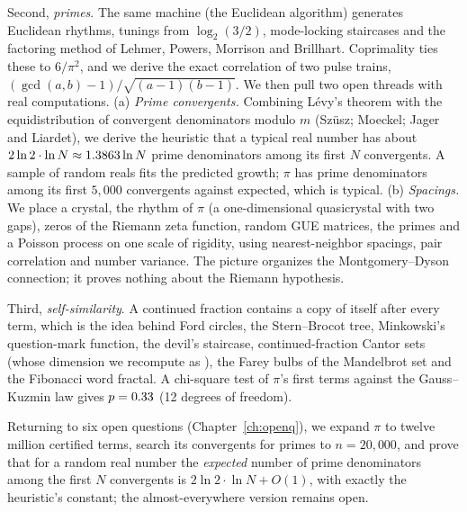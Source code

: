 Second, \emph{primes}. The same machine (the Euclidean algorithm) generates Euclidean rhythms, tunings from $\log_2(3/2)$, mode-locking staircases and the factoring method of Lehmer, Powers, Morrison and Brillhart. Coprimality ties these to $6/\pi^2$, and we derive the exact correlation of two pulse trains, $(\gcd(a,b)-1)/\sqrt{(a-1)(b-1)}$. We then pull two open threads with real computations. (a) \emph{Prime convergents.} Combining Lévy's theorem with the equidistribution of convergent denominators modulo $m$ (Szüsz; Moeckel; Jager and Liardet), we derive the heuristic that a typical real number has about $2\ln 2 \cdot \ln N \approx 1.3863\ln N$ prime denominators among its first $N$ convergents. A sample of \RandM{} random reals fits the predicted growth; $\pi$ has \PiQPrimes{} prime denominators among its first $5{,}000$ convergents against \PiQExp{} expected, which is typical. (b) \emph{Spacings.} We place a crystal, the rhythm of $\pi$ (a one-dimensional quasicrystal with two gaps), \NZeros{} zeros of the Riemann zeta function, random GUE matrices, the primes and a Poisson process on one scale of rigidity, using nearest-neighbor spacings, pair correlation and number variance. The picture organizes the Montgomery--Dyson connection; it proves nothing about the Riemann hypothesis.

Third, \emph{self-similarity}. A continued fraction contains a copy of itself after every term, which is the idea behind Ford circles, the Stern--Brocot tree, Minkowski's question-mark function, the devil's staircase, continued-fraction Cantor sets (whose dimension we recompute as \DimEtwo{}), the Farey bulbs of the Mandelbrot set and the Fibonacci word fractal. A chi-square test of $\pi$'s first \NT{} terms against the Gauss--Kuzmin law gives $p = 0.33$ (12 degrees of freedom).

Returning to six open questions (Chapter~\ref{ch:openq}), we expand $\pi$ to twelve million certified terms, search its convergents for primes to $n = 20{,}000$, and prove that for a random real number the \emph{expected} number of prime denominators among the first $N$ convergents is $2\ln 2 \cdot \ln N + O(1)$, with exactly the heuristic's constant; the almost-everywhere version remains open. \addedon{\revA}

